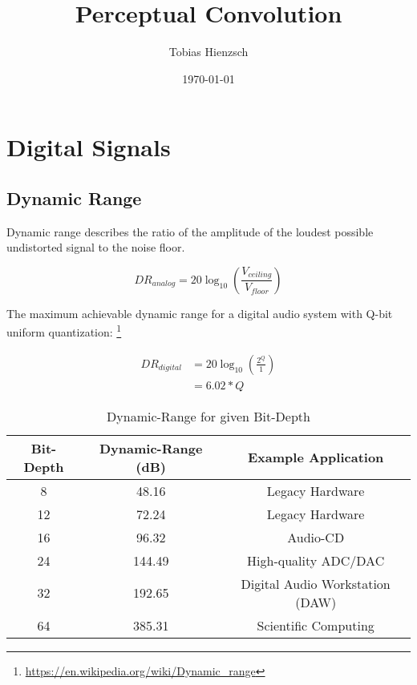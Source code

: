 \documentclass[oneside]{report}
\title{Perceptual Convolution}
\author{Tobias Hienzsch}
\date{\today}
\begin{document}
\maketitle
\newpage

\tableofcontents
\newpage

\thispagestyle{empty}
\listoffigures
\listoftables
\listofalgorithms
\newpage


\chapter{Digital Signals}

\section{Dynamic Range}

Dynamic range describes the ratio of the amplitude of the loudest possible
undistorted signal to the noise floor. \cite{Mller2021}

\begin{equation}
    DR_{analog} = 20\log_{10} \left(\frac{V_{ceiling}}{V_{floor}}\right)
\end{equation}

The maximum achievable dynamic range for a digital audio system with Q-bit
uniform quantization:
\footnote{\url{https://en.wikipedia.org/wiki/Dynamic_range}}

\begin{equation}
    \begin{split}
        DR_{digital} & = 20\log_{10} \left(\frac{2^Q}{1}\right) \\
                     & = 6.02 * Q
    \end{split}
\end{equation}

\begin{center}

\end{center}

\begin{table}[h!]
    \centering
    \begin{tabular}{||c c c||}
        \hline
        Bit-Depth & Dynamic-Range (dB) & Example Application \\
        \hline
        \hline
        8 & 48.16 & Legacy Hardware \\
        \hline
        12 & 72.24 & Legacy Hardware \\
        \hline
        16 & 96.32 & Audio-CD \\
        \hline
        24 & 144.49 & High-quality ADC/DAC \\
        \hline
        32 & 192.65 & Digital Audio Workstation (DAW) \\
        \hline
        64 & 385.31 & Scientific Computing \\
        \hline
    \end{tabular}
    \caption{Dynamic-Range for given Bit-Depth}
    \label{table:1}
\end{table}
\end{document}
